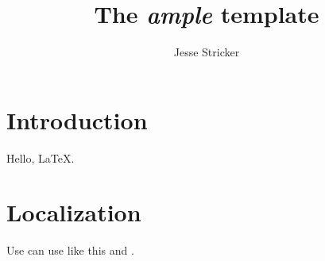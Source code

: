 \documentclass[article,english]{template/ample}
\title{The \emph{ample} template}
\author{Jesse Stricker}
\begin{document}
\maketitle
\tableofcontents

\section{Introduction}

Hello, \LaTeX.

\section{Localization}

Use can use  like this and .
\end{document}
